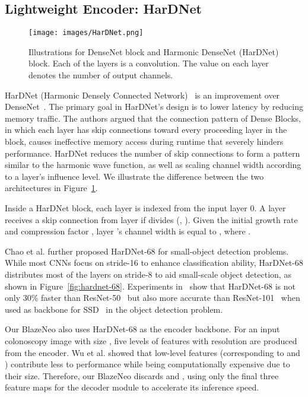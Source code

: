 \documentclass{ieeeaccess}
\newcommand{\ModelName}{BlazeNeo\xspace}
\begin{document}
\subsection{Lightweight Encoder: HarDNet}

\begin{center}
    \begin{figure}[th]
        \begin{center}
            \texttt{[image: images/HarDNet.png]}
        \end{center}
        \caption{Illustrations for DenseNet block and Harmonic DenseNet (HarDNet) block. Each of the layers is a  convolution. The value on each layer denotes the number of output channels.}
        \label{fig:hardnet}
    \end{figure}
\end{center}

HarDNet (Harmonic Densely Connected Network)~\cite{chao2019hardnet} is an improvement over DenseNet~\cite{huang2017densely}. The primary goal in HarDNet's design is to lower latency by reducing memory traffic. The authors argued that the connection pattern of Dense Blocks, in which each layer has skip connections toward every proceeding layer in the block, causes ineffective memory access during runtime that severely hinders performance. HarDNet reduces the number of skip connections to form a pattern similar to the harmonic wave function, as well as scaling channel width according to a layer's influence level. We illustrate the difference between the two architectures in Figure~\ref{fig:hardnet}.

Inside a HarDNet block, each layer is indexed from the input layer 0. A layer  receives a skip connection from layer  if  divides  (, ). Given the initial growth rate  and compression factor , layer 's channel width is equal to , where .

Chao et al. \cite{chao2019hardnet} further proposed HarDNet-68 for small-object detection problems. While most CNNs focus on stride-16 to enhance classification ability, HarDNet-68 distributes most of the layers on stride-8 to aid small-scale object detection, as shown in Figure~\ref{fig:hardnet-68}. Experiments in~\cite{chao2019hardnet} show that HarDNet-68 is not only 30\% faster than ResNet-50~\cite{he2016deep} but also more accurate than ResNet-101~\cite{he2016deep} when used as backbone for SSD~\cite{liu2016ssd} in the object detection problem.

Our \ModelName also uses HarDNet-68 as the encoder backbone. For an input colonoscopy image  with size  , five levels of features  with resolution  are produced from the encoder. Wu et al. \cite{wu2019cascaded} showed that low-level features (corresponding to  and ) contribute less to performance while being computationally expensive due to their size. Therefore, our \ModelName discards  and , using only the final three feature maps for the decoder module to accelerate its inference speed.
\end{document}
